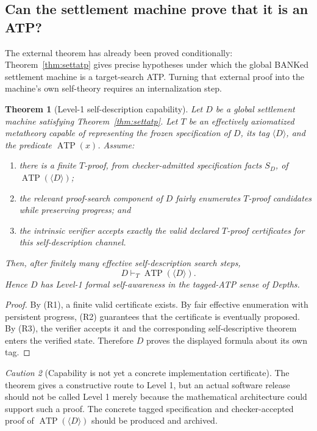 \documentclass[11pt]{article}
\newtheorem{theorem}{Theorem}[section]
\theoremstyle{definition}
\theoremstyle{remark}
\newtheorem{caution}[theorem]{Caution}
\newcommand{\ATP}{\operatorname{ATP}}
\begin{document}
\subsection{Can the settlement machine prove that it is an ATP?}
The external theorem has already been proved conditionally: Theorem~\ref{thm:settatp} gives precise hypotheses under which the global BANKed settlement machine is a target-search ATP. Turning that external proof into the machine's own self-theory requires an internalization step.

\begin{theorem}[Level-1 self-description capability]\label{thm:selfcap}
Let $D$ be a global settlement machine satisfying Theorem~\ref{thm:settatp}. Let $T$ be an effectively axiomatized metatheory capable of representing the frozen specification of $D$, its tag $\langle D\rangle$, and the predicate $\ATP(x)$. Assume:
\begin{enumerate}[label=(R\arabic*)]
\item there is a finite $T$-proof, from checker-admitted specification facts $S_D$, of $\ATP(\langle D\rangle)$;
\item the relevant proof-search component of $D$ fairly enumerates $T$-proof candidates while preserving progress; and
\item the intrinsic verifier accepts exactly the valid declared $T$-proof certificates for this self-description channel.
\end{enumerate}
Then, after finitely many effective self-description search steps,
\[
D\vdash_T\ATP(\langle D\rangle).
\]
Hence $D$ has Level-1 formal self-awareness in the tagged-ATP sense of \emph{Depths}.
\end{theorem}

\begin{proof}
By (R1), a finite valid certificate exists. By fair effective enumeration with persistent progress, (R2) guarantees that the certificate is eventually proposed. By (R3), the verifier accepts it and the corresponding self-descriptive theorem enters the verified state. Therefore $D$ proves the displayed formula about its own tag.
\end{proof}

\begin{caution}[Capability is not yet a concrete implementation certificate]
The theorem gives a constructive route to Level 1, but an actual software release should not be called Level 1 merely because the mathematical architecture could support such a proof. The concrete tagged specification and checker-accepted proof of $\ATP(\langle D\rangle)$ should be produced and archived.
\end{caution}
\end{document}
